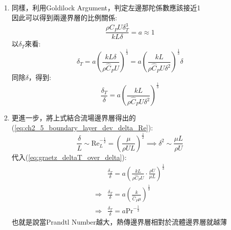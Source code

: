 \documentclass[../main.tex]{subfiles}
\begin{document}
\begin{itemize}
\begin{enumerate}
\begin{align}
        y_T^{\ast 2} \frac{\partial T^\ast}{\partial y_T^\ast}
      \right] =  \frac{k}{\delta_T^2} \left(\frac{\partial^2 T^\ast}{\partial y_T^{\ast 2}}\right) \nonumber\\
      \Rightarrow & \frac{\rho \hat C_P U \delta_T^3}{k L\delta} \left[
        y_T^\ast \frac{\partial T^\ast}{\partial x^\ast} +
        y_T^{\ast 2} \frac{\partial T^\ast}{\partial y_T^\ast}
      \right] = \frac{\partial^2 T^\ast}{\partial y_T^{\ast 2}} \label{eq:graetz_energy_equation_dimensionless}
    \end{align}
    \item 同樣，利用Goldilock Argument，判定左邊那陀係數應該接近1\\
    因此可以得到兩邊界層的比例關係:
    \begin{equation}
      \frac{\rho \hat C_P U \delta_T^3}{k L\delta} = a \approx 1
    \end{equation}
    以$\delta_T$來看:
    \begin{equation}
      \delta_T = a\left(
        \frac{kL \delta}{ \rho \hat C_P U}
      \right)^{\frac{1}{3}} =  a\left(
        \frac{kL}{ \rho \hat C_P U\delta^2}
      \right)^{\frac{1}{3}} \delta
    \end{equation}
    同除$\delta$，得到:
    \begin{equation}
      \boxed{\frac{\delta_T}{\delta} = a\left(
        \frac{kL}{\rho \hat C_P U\delta^2}
        \right)^{\frac{1}{3}}} \label{eq:graetz_deltaT_over_delta}
    \end{equation}
    \item 更進一步，將上式結合流場邊界層得出的(\ref{eq:ch2_5_boundary_layer_dev_delta_Re}):
    \begin{equation}
      \frac{\delta}{L} \sim \text{Re}_L^{-\frac{1}{2}} = \left(
        \frac{\mu}{\rho U L}
      \right)^{\frac{1}{2}} \implies \delta^2 \sim \frac{\mu L}{\rho U}
    \end{equation}
    代入(\ref{eq:graetz_deltaT_over_delta}):
    \begin{align}
      & \frac{\delta_T}{\delta} = a\left(
        \frac{kL}{\rho \hat C_P U} \cdot \frac{\rho U}{\mu L}
      \right)^{\frac{1}{3}} \nonumber\\
      \Rightarrow & \frac{\delta_T}{\delta} = a\left(
        \frac{k}{\hat C_P \mu}
      \right)^{\frac{1}{3}} \nonumber\\
      \Rightarrow & \boxed{\frac{\delta_T}{\delta} = a\text{Pr}^{-\frac{1}{3}}}
    \end{align}
    也就是說當Prandtl Number越大，熱傳邊界層相對於流體邊界層就越薄\\

\end{enumerate}
\end{itemize}
\end{document}
